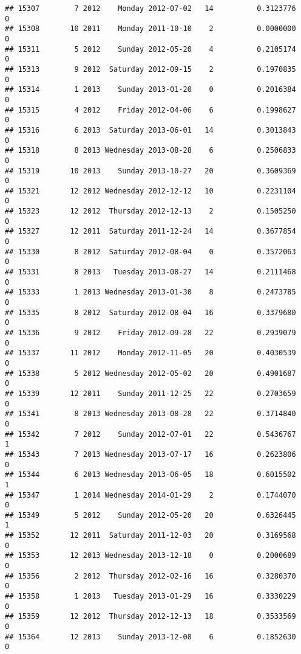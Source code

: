 \documentclass[
]{article}
\begin{document}
\begin{verbatim}
## 15307        7 2012    Monday 2012-07-02   14          0.3123776             0
## 15308       10 2011    Monday 2011-10-10    2          0.0000000             0
## 15311        5 2012    Sunday 2012-05-20    4          0.2105174             0
## 15313        9 2012  Saturday 2012-09-15    2          0.1970835             0
## 15314        1 2013    Sunday 2013-01-20    0          0.2016384             0
## 15315        4 2012    Friday 2012-04-06    6          0.1998627             0
## 15316        6 2013  Saturday 2013-06-01   14          0.3013843             0
## 15318        8 2013 Wednesday 2013-08-28    6          0.2506833             0
## 15319       10 2013    Sunday 2013-10-27   20          0.3609369             0
## 15321       12 2012 Wednesday 2012-12-12   10          0.2231104             0
## 15323       12 2012  Thursday 2012-12-13    2          0.1505250             0
## 15327       12 2011  Saturday 2011-12-24   14          0.3677854             0
## 15330        8 2012  Saturday 2012-08-04    0          0.3572063             0
## 15331        8 2013   Tuesday 2013-08-27   14          0.2111468             0
## 15333        1 2013 Wednesday 2013-01-30    8          0.2473785             0
## 15335        8 2012  Saturday 2012-08-04   16          0.3379680             0
## 15336        9 2012    Friday 2012-09-28   22          0.2939079             0
## 15337       11 2012    Monday 2012-11-05   20          0.4030539             0
## 15338        5 2012 Wednesday 2012-05-02   20          0.4901687             0
## 15339       12 2011    Sunday 2011-12-25   22          0.2703659             0
## 15341        8 2013 Wednesday 2013-08-28   22          0.3714840             0
## 15342        7 2012    Sunday 2012-07-01   22          0.5436767             1
## 15343        7 2013 Wednesday 2013-07-17   16          0.2623806             0
## 15344        6 2013 Wednesday 2013-06-05   18          0.6015502             1
## 15347        1 2014 Wednesday 2014-01-29    2          0.1744070             0
## 15349        5 2012    Sunday 2012-05-20   20          0.6326445             1
## 15352       12 2011  Saturday 2011-12-03   20          0.3169568             0
## 15353       12 2013 Wednesday 2013-12-18    0          0.2000689             0
## 15356        2 2012  Thursday 2012-02-16   16          0.3280370             0
## 15358        1 2013   Tuesday 2013-01-29   16          0.3330229             0
## 15359       12 2012  Thursday 2012-12-13   18          0.3533569             0
## 15364       12 2013    Sunday 2013-12-08    6          0.1852630             0

\end{verbatim}
\end{document}
